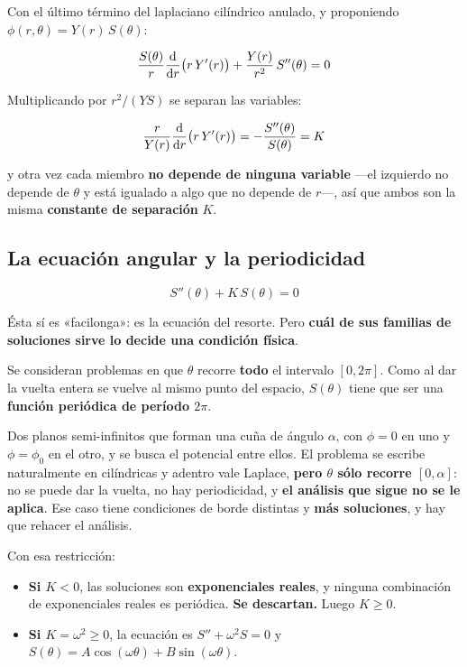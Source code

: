 \documentclass[12pt,a4paper]{article}
\begin{document}
Con el último término del laplaciano cilíndrico anulado, y proponiendo
$\phi(r,\theta) = Y(r)\,S(\theta)$:

\[
\frac{S(\theta)}{r}\dv{r}\big(r\,Y'(r)\big) + \frac{Y(r)}{r^2}\,S''(\theta) = 0
\]

Multiplicando por $r^2/(Y S)$ se separan las variables:

\[
\frac{r}{Y(r)}\dv{r}\big(r\,Y'(r)\big) = -\frac{S''(\theta)}{S(\theta)} = K
\]

y otra vez cada miembro \textbf{no depende de ninguna variable} ---el izquierdo no
depende de $\theta$ y está igualado a algo que no depende de $r$---, así que ambos
son la misma \textbf{constante de separación} $K$.

\subsection{La ecuación angular y la periodicidad}

\[
S''(\theta) + K\,S(\theta) = 0
\]

Ésta sí es «facilonga»: es la ecuación del resorte. Pero \textbf{cuál de sus
familias de soluciones sirve lo decide una condición física}.

\begin{keybox}[La restricción]
Se consideran problemas en que $\theta$ recorre \textbf{todo} el intervalo
$[0,2\pi]$. Como al dar la vuelta entera se vuelve al mismo punto del espacio,
$S(\theta)$ tiene que ser una \textbf{función periódica de período $2\pi$}.
\end{keybox}

\begin{warnbox}
Dos planos semi-infinitos que forman una cuña de ángulo $\alpha$, con $\phi=0$ en
uno y $\phi=\phi_0$ en el otro, y se busca el potencial entre ellos. El problema se
escribe naturalmente en cilíndricas y adentro vale Laplace, \textbf{pero $\theta$
sólo recorre $[0,\alpha]$}: no se puede dar la vuelta, no hay periodicidad, y
\textbf{el análisis que sigue no se le aplica}. Ese caso tiene condiciones de borde
distintas y \textbf{más soluciones}, y hay que rehacer el análisis.
\end{warnbox}

Con esa restricción:

\begin{itemize}[leftmargin=*]
  \item \textbf{Si $K < 0$}, las soluciones son \textbf{exponenciales reales}, y
        ninguna combinación de exponenciales reales es periódica.
        \textbf{Se descartan.} Luego $K \ge 0$.
  \item \textbf{Si $K = \omega^2 \ge 0$}, la ecuación es $S'' + \omega^2 S = 0$ y
        $S(\theta) = A\cos(\omega\theta) + B\sin(\omega\theta)$.
\end{itemize}
\end{document}
